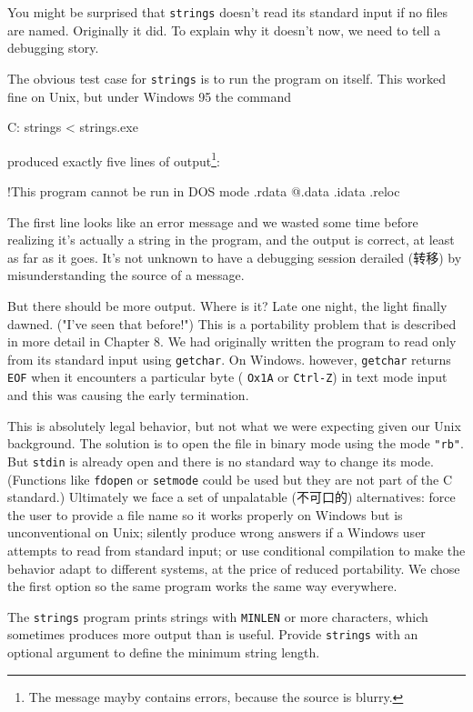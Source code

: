 You might be surprised that \verb'strings' doesn't read its standard input
if no files are named. Originally it did. To explain why it doesn't now, we
need to tell a debugging story.

The obvious test case for \verb'strings' is to run the program on itself.
This worked fine on Unix, but under Windows 95 the command
\begin{wellcode}
    C:\> strings < strings.exe
\end{wellcode}
produced exactly five lines of output\footnote{The message mayby contains
errors, because the source is blurry.}:
\begin{wellcode}
    !This program cannot be run in DOS mode
    .rdata
    @.data
    .idata
    .reloc
\end{wellcode}
The first line looks like an error message and we wasted some time before
realizing it's actually a string in the program, and the output is correct,
at least as far as it goes.  It's not unknown to have a debugging session
derailed (转移) by misunderstanding the source of a message.

But there should be more output. Where is it? Late one night, the light
finally dawned. ("I've seen that before!") This is a portability problem
that is described in more detail in Chapter 8. We had originally written
the program to read only from its standard input using \verb'getchar'. On
Windows. however, \verb'getchar' returns \verb'EOF' when it encounters a
particular byte ( \verb'Ox1A' or \verb'Ctrl-Z') in text mode input and this
was causing the early termination.

This is absolutely legal behavior, but not what we were expecting given our
Unix background. The solution is to open the file in binary mode using the
mode \verb'"rb"'.  But \verb'stdin' is already open and there is no
standard way to change its mode. (Functions like \verb'fdopen' or
\verb'setmode' could be used but they are not part of the C standard.)
Ultimately we face a set of unpalatable (不可口的) alternatives: force the
user to provide a file name so it works properly on Windows but is
unconventional on Unix; silently produce wrong answers if a Windows user
attempts to read from standard input; or use conditional compilation to
make the behavior adapt to different systems, at the price of reduced
portability. We chose the first option so the same program works the same
way everywhere.

\begin{exercise}
    The \verb'strings' program prints strings with \verb'MINLEN' or more
    characters, which sometimes produces more output than is useful.
    Provide \verb'strings' with an optional argument to define the minimum
    string length.
\end{exercise}

